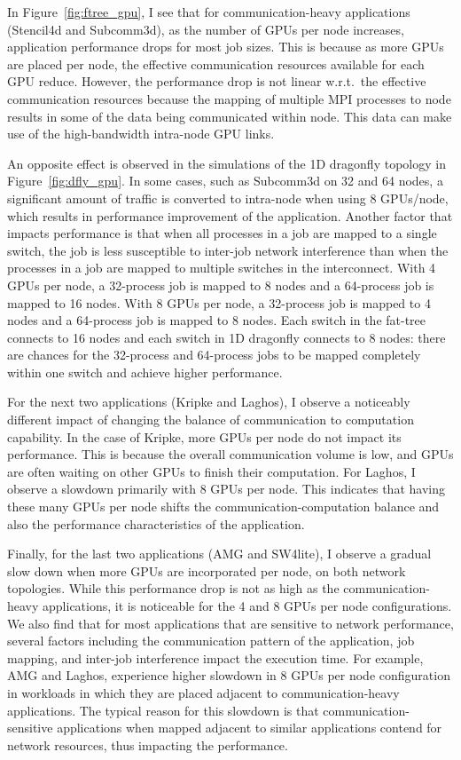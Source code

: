 In Figure~\ref{fig:ftree_gpu}, I see that for communication-heavy
applications (Stencil4d and Subcomm3d), as the number of GPUs per node
increases, application performance drops for most job sizes. This is because
as more GPUs are placed per node, the effective communication resources
available for each GPU reduce. However, the performance drop is not linear
w.r.t.~the effective communication resources because the mapping of multiple
MPI processes to node results in some of the data being communicated within
node. This data can make use of the high-bandwidth intra-node GPU links.

An opposite effect is observed in the simulations of the 1D dragonfly
topology in Figure~\ref{fig:dfly_gpu}. In some cases, such as Subcomm3d on
32 and 64 nodes, a significant amount of traffic is converted to intra-node
when using 8 GPUs/node, which results in performance improvement of the
application.  Another factor that impacts performance is that when all
processes in a job are mapped to a single switch, the job is less
susceptible to inter-job network interference than when the processes in a
job are mapped to multiple switches in the interconnect.  With 4 GPUs per
node, a 32-process job is mapped to 8 nodes and a 64-process job is mapped
to 16 nodes.  With 8 GPUs per node, a 32-process job is mapped to 4 nodes
and a 64-process job is mapped to 8 nodes.  Each switch in the fat-tree
connects to 16 nodes and each switch in 1D dragonfly connects to 8 nodes:
there are chances for the 32-process and 64-process jobs to be mapped
completely within one switch and achieve higher performance.  

For the next two applications (Kripke and Laghos), I observe a noticeably
different impact of changing the balance of communication to computation
capability. In the case of Kripke, more GPUs per node do not impact its performance. This
is because the overall communication volume is low, and GPUs are often waiting
on other GPUs to finish their computation. For Laghos, I observe a
slowdown primarily with 8 GPUs per node. This indicates that having these many
GPUs per node shifts the communication-computation balance and also the performance 
characteristics of the application.

Finally, for the last two applications (AMG and SW4lite), I observe a gradual
slow down when more GPUs are incorporated per node, on both network topologies. While this performance drop
is not as high as the communication-heavy applications, it is noticeable for the 4
and 8 GPUs per node configurations.  We also find that for most
applications that are sensitive to network performance, several factors
including the communication pattern of the application, job mapping, and
inter-job interference impact the execution time. For example, AMG and Laghos,
experience higher slowdown in 8 GPUs per node configuration in workloads in
which they are placed adjacent to communication-heavy applications. 
The typical reason for
this slowdown is that communication-sensitive applications when mapped
adjacent to similar applications contend for network resources, thus impacting
the performance.

